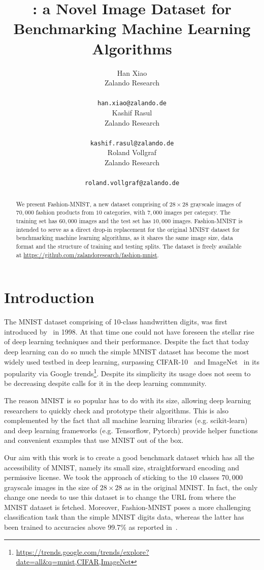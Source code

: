 \documentclass{article}
\title{\fmnist: a Novel Image Dataset for Benchmarking Machine Learning Algorithms}
\author{Han Xiao\\
  Zalando Research\\
  \zraddress\\
  \texttt{han.xiao@zalando.de}\\
  \And
  Kashif Rasul\\
  Zalando Research\\
  \zraddress\\
  \texttt{kashif.rasul@zalando.de}\\
  \And
  Roland Vollgraf\\
  Zalando Research\\
  \zraddress\\
  \texttt{roland.vollgraf@zalando.de}\\
}
\newcommand{\fmnist}{Fashion-MNIST\xspace}
\newcommand{\repo}{\url{https://github.com/zalandoresearch/fashion-mnist}}
\begin{document}
\maketitle

\begin{abstract}
We present \fmnist, a new dataset comprising of $28\times 28$ grayscale images of $70,000$ fashion products from $10$ categories, with $7,000$ images per category. The training set has $60,000$ images and the test set has $10,000$ images. \fmnist is intended to serve as a direct drop-in replacement for the original MNIST dataset for benchmarking machine learning algorithms, as it shares the same image size, data format and the structure of training and testing splits. The dataset is freely available at \repo.
\end{abstract}

\section{Introduction}

The MNIST dataset comprising of 10-class handwritten digits, was first introduced by~\citet{lecun1998gradient} in 1998. At that time one could not have foreseen the stellar rise of deep learning techniques and their performance. Despite the fact that today deep learning can do so much the simple MNIST dataset has become the most widely used testbed in deep learning, surpassing CIFAR-10~\citep{krizhevsky2009learning} and ImageNet~\citep{deng2009imagenet} in its popularity via Google trends\footnote{\url{https://trends.google.com/trends/explore?date=all&q=mnist,CIFAR,ImageNet}}. Despite its simplicity its usage does not seem to be decreasing despite calls for it in the deep learning community.

The reason MNIST is so popular has to do with its size, allowing deep learning researchers to quickly check and prototype their algorithms. This is also complemented by the fact that all machine learning libraries (e.g. scikit-learn) and deep learning frameworks (e.g. Tensorflow, Pytorch) provide helper functions and convenient examples that use MNIST out of the box. 

Our aim with this work is to create a good benchmark dataset which has all the accessibility of MNIST, namely its small size, straightforward encoding and permissive license. We took the approach of sticking to the $10$ classes $70,000$ grayscale images in the size of $28\times 28$ as in the original MNIST. In fact, the only change one needs to use this dataset is to change the URL from where the MNIST dataset is fetched. Moreover, \fmnist poses a more challenging classification task than the simple MNIST digits data, whereas the latter has been trained to accuracies above 99.7\% as reported in~\citet{wan2013regularization,ciregan2012multi}.
\end{document}
